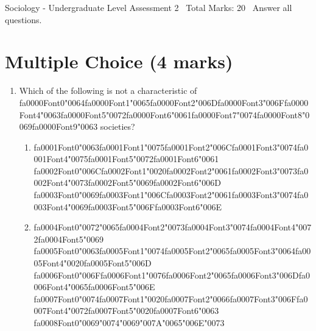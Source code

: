 \documentclass[12pt]{article}
\begin{document}
\begin{center}
Sociology - Undergraduate Level Assessment 2 \
Total Marks: 20 \
Answer all questions.
\end{center}

\section*{Multiple Choice (4 marks)}
\begin{enumerate}[label=\arabic*.]
\item Which of the following is not a characteristic of {\csname fa0000Font0\endcsname\char"0064}{\csname fa0000Font1\endcsname\char"0065}{\csname fa0000Font2\endcsname\char"006D}{\csname fa0000Font3\endcsname\char"006F}{\csname fa0000Font4\endcsname\char"0063}{\csname fa0000Font5\endcsname\char"0072}{\csname fa0000Font6\endcsname\char"0061}{\csname fa0000Font7\endcsname\char"0074}{\csname fa0000Font8\endcsname\char"0069}{\csname fa0000Font9\endcsname\char"0063} societies?
\begin{enumerate}[label=(\alph*)]
    \item {\csname fa0001Font0\endcsname\char"0063}{\csname fa0001Font1\endcsname\char"0075}{\csname fa0001Font2\endcsname\char"006C}{\csname fa0001Font3\endcsname\char"0074}{\csname fa0001Font4\endcsname\char"0075}{\csname fa0001Font5\endcsname\char"0072}{\csname fa0001Font6\endcsname\char"0061} {\csname fa0002Font0\endcsname\char"006C}{\csname fa0002Font1\endcsname\char"0020}{\csname fa0002Font2\endcsname\char"0061}{\csname fa0002Font3\endcsname\char"0073}{\csname fa0002Font4\endcsname\char"0073}{\csname fa0002Font5\endcsname\char"0069}{\csname fa0002Font6\endcsname\char"006D} {\csname fa0003Font0\endcsname\char"0069}{\csname fa0003Font1\endcsname\char"006C}{\csname fa0003Font2\endcsname\char"0061}{\csname fa0003Font3\endcsname\char"0074}{\csname fa0003Font4\endcsname\char"0069}{\csname fa0003Font5\endcsname\char"006F}{\csname fa0003Font6\endcsname\char"006E}
    \item {\csname fa0004Font0\endcsname\char"0072}{\char"0065}{\csname fa0004Font2\endcsname\char"0073}{\csname fa0004Font3\endcsname\char"0074}{\csname fa0004Font4\endcsname\char"0072}{\csname fa0004Font5\endcsname\char"0069} {\csname fa0005Font0\endcsname\char"0063}{\csname fa0005Font1\endcsname\char"0074}{\csname fa0005Font2\endcsname\char"0065}{\csname fa0005Font3\endcsname\char"0064}{\csname fa0005Font4\endcsname\char"0020}{\csname fa0005Font5\endcsname\char"006D} {\csname fa0006Font0\endcsname\char"006F}{\csname fa0006Font1\endcsname\char"0076}{\csname fa0006Font2\endcsname\char"0065}{\csname fa0006Font3\endcsname\char"006D}{\csname fa0006Font4\endcsname\char"0065}{\csname fa0006Font5\endcsname\char"006E} {\csname fa0007Font0\endcsname\char"0074}{\csname fa0007Font1\endcsname\char"0020}{\csname fa0007Font2\endcsname\char"0066}{\csname fa0007Font3\endcsname\char"006F}{\csname fa0007Font4\endcsname\char"0072}{\csname fa0007Font5\endcsname\char"0020}{\csname fa0007Font6\endcsname\char"0063} {\csname fa0008Font0\endcsname\char"0069}{\char"0074}{\char"0069}{\char"007A}{\char"0065}{\char"006E}{\char"0073}

\end{enumerate}
\end{enumerate}
\end{document}
